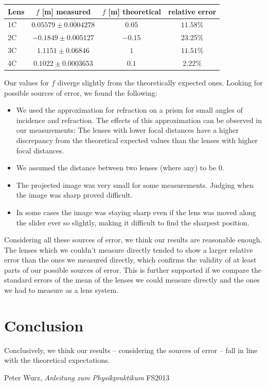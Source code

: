 \documentclass{scrreprt}
\begin{document}
\begin{table}[H]
\center
\begin{tabular}{|l|c|c|c|}
\hline
Lens & $f$ [m] measured & $f$ [m] theoretical & relative error\\
\hline
1C & $ 0.05579 \pm 0.0004278$&$0.05$&$11.58\%$\\
2C & $-0.1849 \pm 0.005127$&$-0.15$&$23.25\%$\\
3C & $ 1.1151 \pm 0.06846 $&$1$&$11.51\%$\\
4C & $0.1022 \pm 0.0003653$&$0.1$&$2.22\%$\\
\hline
\end{tabular}
\end{table} 
Our values for $f$ diverge slightly from the theoretically expected ones. Looking for possible sources of error, we found the following:
\begin{itemize}
\item We used the approximation for refraction on a prism for small angles of incidence and refraction. The effects of this approximation can be observed in our measurements: The lenses with lower focal distances have a higher discrepancy from the theoretical expected values than the lenses with higher focal distances.
\item We assumed the distance between two lenses (where any) to be 0.
\item The projected image was very small for some measurements. Judging when the image was sharp proved difficult.
\item In some cases the image was staying sharp even if the lens was moved along the slider ever so slightly, making it difficult to find the sharpest position.
\end{itemize}
Considering all these sources of error, we think our results are reasonable enough. The lenses which we couldn't measure directly tended to show a larger relative error than the ones we measured directly, which confirms the validity of at least parts of our possible sources of error. This is further supported if we compare the standard errors of the mean of the lenses we could measure directly and the ones we had to measure as a lens system.
\section{Conclusion}

Conclusively, we think our results -- considering the sources of error -- fall in line with the theoretical expectations. 


\begin{thebibliography}{9}

  Peter Wurz,
  \emph{Anleitung zum Physikpraktikum}
  FS2013

\end{thebibliography}
\end{document}
